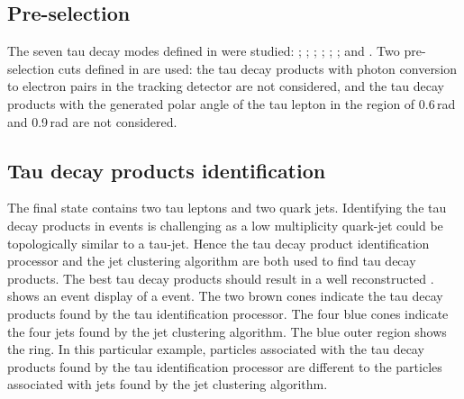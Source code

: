 \subsection{Pre-selection}

The seven tau decay modes defined in  were studied: \tauToElectron; \tauToMuon; \tauToPion; \tauToRho; \tauToAiPhoton; \tauToAiPion; and \tauToThreePion. Two pre-selection cuts defined in  are used: the tau decay products with photon conversion to electron pairs in the tracking detector are not considered, and the tau decay products with the generated polar angle of the tau lepton in the region of 0.6\,rad and 0.9\,rad are not considered.

\subsection{Tau decay products identification}
\label{sec:tauHZfindTau}

The \eeZZQQ final state contains two tau leptons and two quark jets. Identifying the tau decay products in \eeZZQQ events is challenging as a low multiplicity quark-jet could be topologically similar  to a tau-jet. Hence the tau decay product identification processor and the jet clustering algorithm are both used to find tau decay products. The best tau decay products should result in a well reconstructed \ZToqq.  shows an event display of a \eeZZQQ event. The two brown cones indicate the tau decay products found by the tau identification processor. The four blue cones indicate the four jets found by the jet clustering algorithm. The blue outer region shows the \HCAL ring. In this particular example, particles associated with the tau decay products found by the tau identification processor are different to the particles associated with jets found by the jet clustering algorithm.





